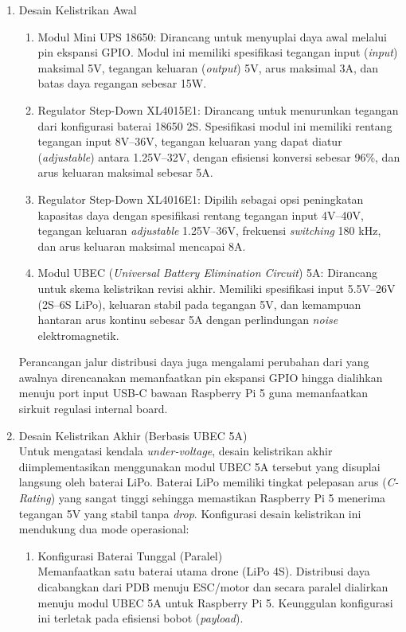 \begin{enumerate}
	\begin{enumerate}
		\item Desain Kelistrikan Awal\\
		\begin{enumerate}
			\item Modul Mini UPS 18650: Dirancang untuk menyuplai daya awal melalui pin ekspansi GPIO. Modul ini memiliki spesifikasi tegangan input (\textit{input}) maksimal 5V, tegangan keluaran (\textit{output}) 5V, arus maksimal 3A, dan batas daya regangan sebesar 15W.
			\item Regulator Step-Down XL4015E1: Dirancang untuk menurunkan tegangan dari konfigurasi baterai 18650 2S. Spesifikasi modul ini memiliki rentang tegangan input 8V--36V, tegangan keluaran yang dapat diatur (\textit{adjustable}) antara 1.25V--32V, dengan efisiensi konversi sebesar 96\%, dan arus keluaran maksimal sebesar 5A.
			\item Regulator Step-Down XL4016E1: Dipilih sebagai opsi peningkatan kapasitas daya dengan spesifikasi rentang tegangan input 4V--40V, tegangan keluaran \textit{adjustable} 1.25V--36V, frekuensi \textit{switching} 180 kHz, dan arus keluaran maksimal mencapai 8A.
			\item Modul UBEC (\textit{Universal Battery Elimination Circuit}) 5A: Dirancang untuk skema kelistrikan revisi akhir. Memiliki spesifikasi input 5.5V--26V (2S--6S LiPo), keluaran stabil pada tegangan 5V, dan kemampuan hantaran arus kontinu sebesar 5A dengan perlindungan \textit{noise} elektromagnetik.
		\end{enumerate}
		
		Perancangan jalur distribusi daya juga mengalami perubahan dari yang awalnya direncanakan memanfaatkan pin ekspansi GPIO hingga dialihkan menuju port input USB-C bawaan Raspberry Pi 5 guna memanfaatkan sirkuit regulasi internal board.
		
		\item Desain Kelistrikan Akhir (Berbasis UBEC 5A)\\
		Untuk mengatasi kendala \textit{under-voltage}, desain kelistrikan akhir diimplementasikan menggunakan modul UBEC 5A tersebut yang disuplai langsung oleh baterai LiPo. Baterai LiPo memiliki tingkat pelepasan arus (\textit{C-Rating}) yang sangat tinggi sehingga memastikan Raspberry Pi 5 menerima tegangan 5V yang stabil tanpa \textit{drop}. Konfigurasi desain kelistrikan ini mendukung dua mode operasional:
		
		\begin{enumerate}
			\item Konfigurasi Baterai Tunggal (Paralel)\\
			Memanfaatkan satu baterai utama drone (LiPo 4S). Distribusi daya dicabangkan dari PDB menuju ESC/motor dan secara paralel dialirkan menuju modul UBEC 5A untuk Raspberry Pi 5. Keunggulan konfigurasi ini terletak pada efisiensi bobot (\textit{payload}).
			

\end{enumerate}
\end{enumerate}
\end{enumerate}
